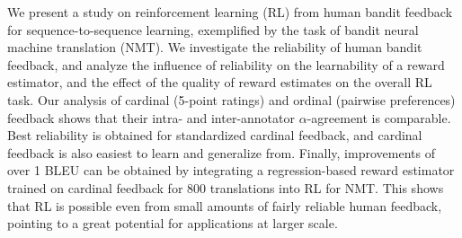 We present a study on reinforcement learning (RL) from human bandit feedback for sequence-to-sequence learning, exemplified by the task of bandit neural machine translation (NMT). We investigate the reliability of human bandit feedback, and analyze the influence of reliability on the learnability of a reward estimator, and the effect of the quality of reward estimates on the overall RL task. Our analysis of cardinal (5-point ratings) and ordinal (pairwise preferences) feedback shows that their intra- and inter-annotator $\alpha$-agreement is comparable. Best reliability is obtained for standardized cardinal feedback, and cardinal feedback is also easiest to learn and generalize from. Finally, improvements of over 1 BLEU can be obtained by integrating a regression-based reward estimator trained on cardinal feedback for 800 translations into RL for NMT. This shows that RL is possible even from small amounts of fairly reliable human feedback, pointing to a great potential for applications at larger scale.
